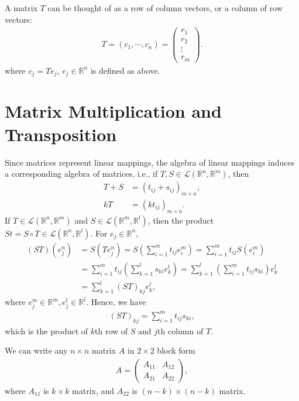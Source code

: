 \documentclass[11pt]{book}
\theoremstyle{definition}
\numberwithin{equation}{chapter}
\begin{document}
A matrix $T$ can be thought of as a row of column vectors, or a column of row vectors: 
\begin{align*}
    T = (c_1,\cdots,c_n) = \left(
    \begin{matrix}
        r_1 \\
        r_2 \\
        \vdots \\
        r_m 
        \end{matrix}
    \right).
\end{align*}
where $c_j = T e_j$, $e_j\in\mathbb{R}^n$ is defined as above.

\medskip
\section{Matrix Multiplication and Transposition}
Since matrices represent linear mappings, the algebra of linear mappings induces a corresponding algebra of matrices, i.e., if $T,S\in \mathscr{L}(\mathbb{R}^n,\mathbb{R}^m)$, then
\begin{align*}
    T+S &= (t_{ij} + s_{ij})_{m\times n},\\
    k T &= (kt_{ij})_{m\times n}.
\end{align*}
If $T\in \mathscr{L}(\mathbb{R}^n,\mathbb{R}^m)$ and $S\in \mathscr{L}(\mathbb{R}^m,\mathbb{R}^l)$, then the product $St = S\circ T \in \mathscr{L}(\mathbb{R}^n,\mathbb{R}^l)$. For $e_j\in\mathbb{R}^n$,
\begin{align*}
    (ST)(e_j^n) & = S(Te_j^n) = S\left(\sum^m_{i=1}t_{ij}e^m_i\right) = \sum^m_{i=1}t_{ij} S(e^m_i) \\
    & = \sum^m_{i=1}t_{ij} \left(\sum^l_{k=1}s_{ki}e^l_k\right) = \sum^l_{k=1}\left(\sum^m_{i=1}t_{ij}s_{ki}\right)e^l_k \\
    & = \sum^l_{k=1}(ST)_{kj} e^l_k,
\end{align*}
where $e_j^m\in\mathbb{R}^m,e_j^l\in\mathbb{R}^l$. Hence, we have 
\begin{align*}
    (ST)_{kj} = \sum^m_{i=1}t_{ij}s_{ki},
\end{align*}
which is the product of $k$th row of $S$ and $j$th column of $T$.

We can write any $n\times n$ matrix $A$ in $2\times 2$ block form
\begin{align*}
    A = \left(
        \begin{matrix}
        A_{11} & A_{12} \\
        A_{21} & A_{22} 
        \end{matrix}
    \right),
\end{align*}
where $A_{11}$ is $k\times k$ matrix, and $A_{22}$ is $(n-k)\times(n-k)$ matrix. 
\end{document}
